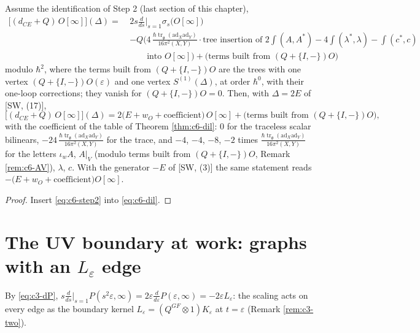 \begin{corollary}
\label{cor:c6-dilcomp}
Assume the identification of Step 2 (last section of this chapter),
\begin{equation}
\begin{aligned}
\big[(d_{CE}+Q)\,O[\infty]\big](\Delta)=\ &2s\frac{d}{ds}\Big|_{s=1}\sigma_s\big(O[\infty]\big)\\
&-Q\Big(4\,\frac{\hbar\operatorname{tr}_{\mathfrak g}(\mathrm{ad}_X\mathrm{ad}_Y)}{16\pi^2(X,Y)}\cdot\text{tree insertion of }2\int(A,A^*)-4\int(\lambda^*,\lambda)-\int(c^*,c)\\
&\qquad\text{into }O[\infty]\Big)+\big(\text{terms built from }(Q+\{I,-\})O\big)
\end{aligned}
\label{eq:c6-step2}
\end{equation}
modulo $\hbar^2$, where the terms built from $(Q+\{I,-\})O$ are the trees with one vertex $(Q+\{I,-\})O(\varepsilon)$ and one vertex $S^{(1)}(\Delta)$, at order $\hbar^0$, with their one-loop corrections; they vanish for $(Q+\{I,-\})O=0$. Then, with $\Delta=2E$ of [SW, (17)],
\begin{equation}
\big[(d_{CE}+Q)\,O[\infty]\big](\Delta)=2\big(E+w_O+\text{coefficient}\big)\,O[\infty]+\big(\text{terms built from }(Q+\{I,-\})O\big),
\label{eq:c6-dilcomp}
\end{equation}
with the coefficient of the table of Theorem \ref{thm:c6-dil}: $0$ for the traceless scalar bilinears, $-24\,\frac{\hbar\operatorname{tr}_{\mathfrak g}(\mathrm{ad}_X\mathrm{ad}_Y)}{16\pi^2(X,Y)}$ for the trace, and $-4$, $-4$, $-8$, $-2$ times $\frac{\hbar\operatorname{tr}_{\mathfrak g}(\mathrm{ad}_X\mathrm{ad}_Y)}{16\pi^2(X,Y)}$ for the letters $\iota_wA$, $A|_V$ (modulo terms built from $(Q+\{I,-\})O$, Remark \ref{rem:c6-AV}), $\lambda$, $c$. With the generator $-E$ of [SW, (3)] the same statement reads $-\big(E+w_O+\text{coefficient}\big)O[\infty]$.
\end{corollary}

\begin{proof}
Insert \eqref{eq:c6-step2} into \eqref{eq:c6-dil}.
\end{proof}

\section{The UV boundary at work: graphs with an $L_\varepsilon$ edge}

By \eqref{eq:c3-dP}, $s\frac{d}{ds}\big|_{s=1}P(s^2\varepsilon,\infty)=2\varepsilon\frac{d}{d\varepsilon}P(\varepsilon,\infty)=-2\varepsilon L_\varepsilon$: the scaling acts on every edge as the boundary kernel $L_\varepsilon=(Q^{GF}\otimes1)K_\varepsilon$ at $t=\varepsilon$ (Remark \ref{rem:c3-two}).

